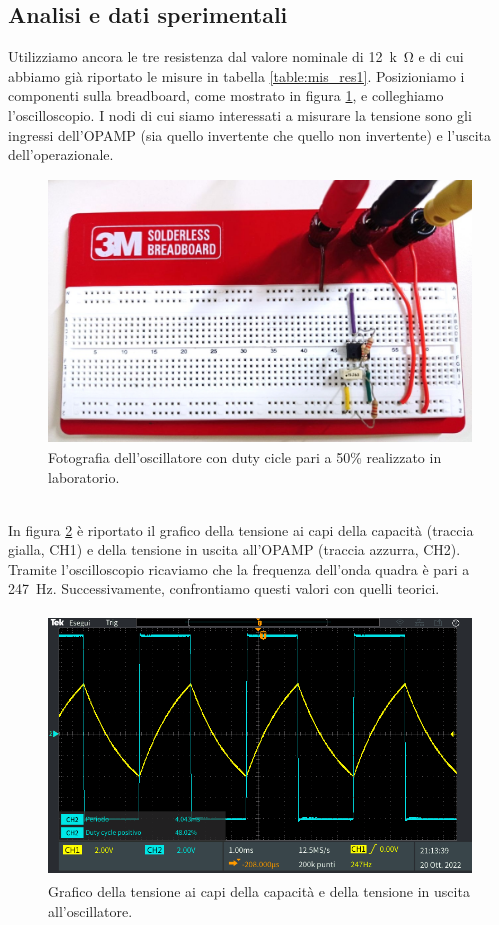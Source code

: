 \documentclass{report}
\begin{document}
\subsection{Analisi e dati sperimentali}
Utilizziamo ancora le tre resistenza dal valore nominale di \SI{12}{k\ohm} e di cui abbiamo già riportato le misure in tabella \ref{table:mis_res1}. Posizioniamo i componenti sulla breadboard, come mostrato in figura \ref{figura:circuito3}, e colleghiamo l'oscilloscopio. I nodi di cui siamo interessati a misurare la tensione sono gli ingressi dell'OPAMP (sia quello invertente che quello non invertente) e l'uscita dell'operazionale.
\begin{figure}[h!]
	\centering
	\includegraphics[height=7cm]{immagini/circuito3}
	\caption{Fotografia dell'oscillatore con duty cicle pari a 50\% realizzato in laboratorio.}
	\label{figura:circuito3}
\end{figure}
\\In figura \ref{figura:oscillo1} è riportato il grafico della tensione ai capi della capacità (traccia gialla, CH1) e della tensione in uscita all'OPAMP (traccia azzurra, CH2). Tramite l'oscilloscopio ricaviamo che la frequenza dell'onda quadra è pari a \SI{247}{\hertz}. Successivamente, confrontiamo questi valori con quelli teorici.
\begin{figure}[h!]
	\centering
	\includegraphics[height=7cm]{immagini/TEK00025}
	\caption{Grafico della tensione ai capi della capacità e della tensione in uscita all'oscillatore.}
	\label{figura:oscillo1}
\end{figure}
\end{document}
